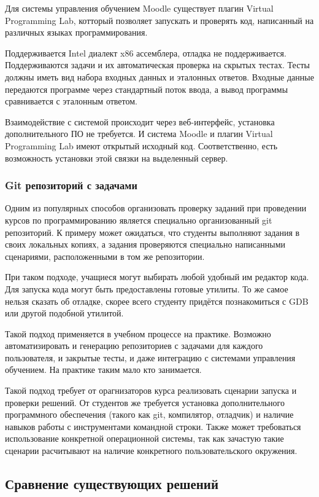 \documentclass[a4paper,article,14pt]{extarticle}
\begin{document}
Для системы управления обучением Moodle\cite{moodle} существует плагин Virtual Programming Lab\cite{vpl}, котторый позволяет запускать и проверять код, написанный на различных языках программирования.

Поддерживается Intel диалект x86 ассемблера, отладка не поддерживается. Поддерживаются задачи и их автоматическая проверка на скрытых тестах. Тесты должны иметь вид набора входных данных и эталонных ответов. Входные данные передаются программе через стандартный поток ввода, а вывод программы сравнивается с эталонным ответом.

Взаимодействие с системой происходит через веб-интерфейс, установка дополнительного ПО не требуется. И система Moodle и плагин Virtual Programming Lab имеют открытый исходный код. Соответственно, есть возможность установки этой связки на выделенный сервер.

\subsubsection{Git репозиторий с задачами}

Одним из популярных способов организовать проверку заданий при проведении курсов по программированию является специально организованный git репозиторий. К примеру может ожидаться, что студенты выполняют задания в своих локальных копиях, а задания проверяются специально написанными сценариями, расположенными в том же репозитории.

При таком подходе, учащиеся могут выбирать любой удобный им редактор кода. Для запуска кода могут быть предоставлены готовые утилиты. То же самое нельзя сказать об отладке, скорее всего студенту придётся познакомиться с GDB или другой подобной утилитой.

Такой подход применяется в учебном процессе на практике. Возможно автоматизировать и генерацию репозиториев с задачами для каждого пользователя, и закрытые тесты, и даже интеграцию с системами управления обучением. На практике таким мало кто занимается.

Такой подход требует от орагнизаторов курса реализовать сценарии запуска и проверки решений. От студентов же требуется установка дополнительного программного обеспечения (такого как git, компилятор, отладчик) и наличие навыков работы с инструментами командной строки. Также может требоваться использование конкретной операционной системы, так как зачастую такие сценарии расчитывают на наличие конкретного пользовательского окружения.


\subsection{Сравнение существующих решений}
\end{document}
